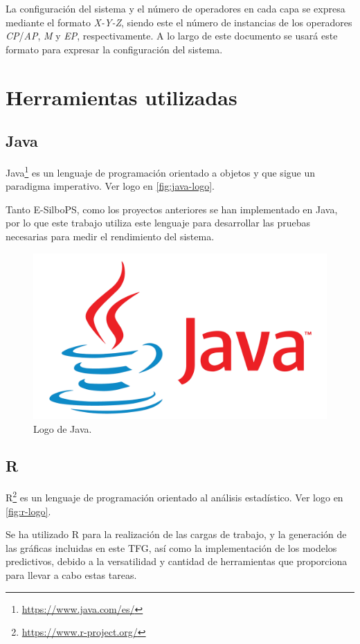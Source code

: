 La configuración del sistema y el número de operadores en cada capa se expresa mediante el 
formato \textit{X-Y-Z}, siendo este el número de instancias de los operadores 
\textit{CP}/\textit{AP}, \textit{M} y \textit{EP}, respectivamente.
A lo largo de este documento se usará este formato para expresar la configuración del sistema.




\section{Herramientas utilizadas}

\subsection*{Java}

Java\footnote{\href{https://www.java.com/es/}{https://www.java.com/es/}} es un 
lenguaje de programación orientado a objetos y que sigue un paradigma imperativo.
Ver logo en \autoref{fig:java-logo}.

Tanto E-SilboPS, como los proyectos anteriores se han implementado en Java, por
lo que este trabajo utiliza este lenguaje para desarrollar las pruebas necesarias
para medir el rendimiento del sistema.

\begin{figure}[htpb]
    \centering
    \includegraphics[width=0.3\linewidth]{images/logos/java-logo.png} 
    \caption{Logo de Java.}
    \label{fig:java-logo}
\end{figure}


\subsection*{R}

R\footnote{\href{https://www.r-project.org/}{https://www.r-project.org/}} es un
lenguaje de programación orientado al análisis estadístico. Ver logo 
en \autoref{fig:r-logo}.

Se ha utilizado R para la realización de las cargas de trabajo, y la generación
de las gráficas incluidas en este TFG, así como la implementación de los modelos
predictivos, debido a la versatilidad y cantidad de herramientas que proporciona
para llevar a cabo estas tareas.

